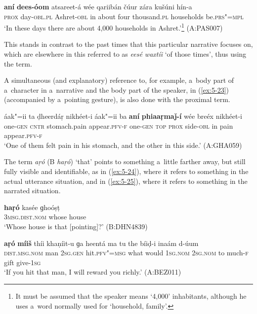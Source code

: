\begin{exe}
\ex
\label{ex:5-22}
\gll \textbf{aní} \textbf{dees-óom} atsareet-á wée qariibán čúur zára kušúni
hín-a \\
\textsc{prox} day-\textsc{obl.pl} Ashret-\textsc{obl} in about four thousand.\textsc{pl} households
be.\textsc{prs"=mpl} \\
\glt `In these days there are about 4,000 households in Ashret.'\footnote{It must be assumed that the speaker means `4,000' inhabitants, although he uses a~word normally used for `household, family'.} (A:PAS007)
\end{exe}
This stands in contrast to the past times that this particular narrative focuses on, which are elsewhere in this  referred to as \textit{eesé waxtíi} `of those times', thus using the  term.

A simultaneous (and explanatory) reference to, for example, a~body part of a~character in a~narrative and the body part of the speaker, in (\ref{ex:5-23}) (accompanied by a~pointing gesture), is also done with the proximal term.


\ea
\label{ex:5-23}
\gll áak"=ii ta ḍheerdáṛ nikhéet-i áak"=ii ba \textbf{aní} \textbf{phiaaṛmaǰ-í} wée breéx nikhéet-i\\
one-\textsc{gen} \textsc{cntr} stomach.pain appear.\textsc{pfv-f} one-\textsc{gen} \textsc{top}
\textsc{prox} side-\textsc{obl} in pain appear.\textsc{pfv-f}\\
\glt `One of them felt pain in his stomach, and the other in this side.' (A:GHA059)
\z

The  term \textit{aṛó} (B \textit{haṛó}) `that' points to something a~little farther away, but still fully visible and identifiable, as in (\ref{ex:5-24}), where it refers to something in the actual utterance situation, and in (\ref{ex:5-25}), where it refers to something in the narrated situation. 

\begin{exe}
\ex
\label{ex:5-24}
\gll \textbf{haṛó} kasée ɡhoóṣṭ \\
\textsc{3msg.dist.nom} whose house \\
\glt `Whose house is that [pointing]?' (B:DHN4839)

\ex
\label{ex:5-25}
\gll \textbf{aṛó} \textbf{míiš} thíi khaṇíit-u ɡa heentá ma tu the bíiḍ-i inaám d-úum \\
\textsc{dist.msg.nom} man \textsc{2sg.gen} hit.\textsc{pfv"=msg} what would \textsc{1}\textsc{sg.nom} 
\textsc{2sg.nom} to much-\textsc{f} gift give-\textsc{1}\textsc{sg} \\
\glt `If you hit that man, I will reward you richly.' (A:BEZ011)
\end{exe}

